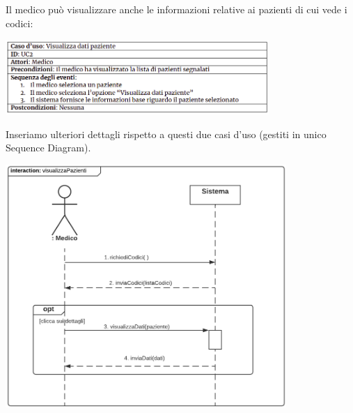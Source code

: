 \documentclass{article}
\begin{document}
\newpage
Il medico può visualizzare anche le informazioni relative ai pazienti di cui vede i codici:
    \begin{center}
        \includegraphics[width=0.75\textwidth]{pictures/UC2.png}
    \end{center}
    Inseriamo ulteriori dettagli rispetto a questi due casi d'uso (gestiti in unico Sequence Diagram).
    \begin{center}
        \includegraphics[width=0.80\textwidth]{pictures/SDMedico2_listaPazienti.png}
    \end{center}
\end{document}
